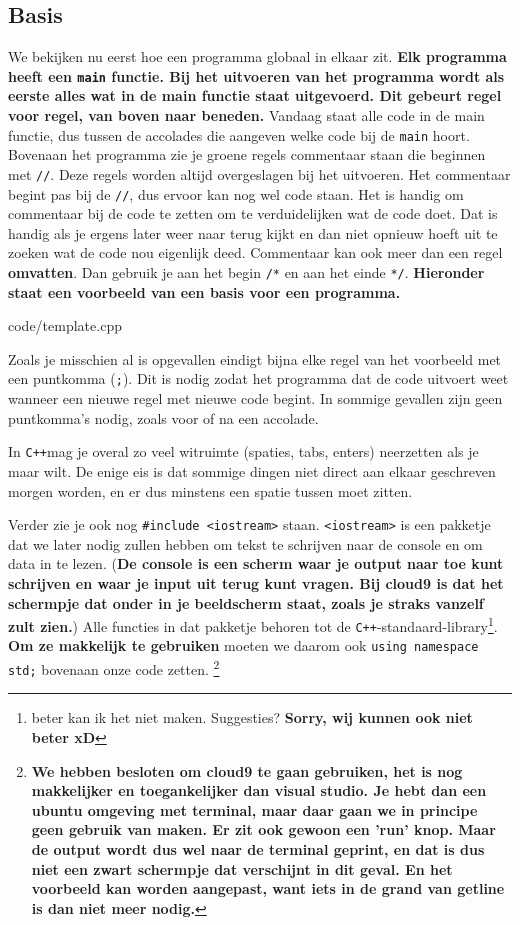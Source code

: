 \documentclass[12pt,a4paper]{article}
\newcommand{\code}{}
\newcommand{\icode}{\lstinline}
\newcommand{\mono}{\texttt}
\newcommand{\cpp}{\mono{C++}}
\begin{document}
\subsection{Basis}
We bekijken nu eerst hoe een programma globaal in elkaar zit.  \textbf{Elk programma heeft een \icode{main} functie. Bij het uitvoeren van het programma wordt als eerste alles wat in de main functie staat uitgevoerd. Dit gebeurt regel voor regel, van boven naar beneden.} Vandaag staat alle code in de main functie, dus tussen de accolades die aangeven welke code bij de \icode{main} hoort.
Bovenaan het programma zie je groene regels commentaar staan die beginnen met \icode{//}. Deze regels worden altijd overgeslagen bij het uitvoeren. Het commentaar begint pas bij de \icode{//}, dus ervoor kan nog wel code staan. Het is handig om commentaar bij de code te zetten om te verduidelijken wat de code doet. Dat is handig als je ergens later weer naar terug kijkt en dan niet opnieuw hoeft uit te zoeken wat de code nou eigenlijk deed. Commentaar kan ook meer dan een regel \textbf{omvatten}. Dan gebruik je aan het begin \icode{/*} en aan het einde \icode{*/}. \textbf{Hieronder staat een voorbeeld van een basis voor een programma.} 

\code{code/template.cpp}

Zoals je misschien al is opgevallen eindigt bijna elke regel van het voorbeeld met een puntkomma (\icode{;}). Dit is nodig zodat het programma dat de code uitvoert weet wanneer een nieuwe regel met nieuwe code begint. In sommige gevallen zijn geen puntkomma's nodig, zoals voor of na een accolade.

In \cpp  mag je overal zo veel witruimte (spaties, tabs, enters) neerzetten als je maar wilt. De enige eis is dat sommige dingen niet direct aan elkaar geschreven morgen worden, en er dus minstens een spatie tussen moet zitten.


Verder zie je ook nog \icode{#include <iostream>} staan. \icode{<iostream>} is een pakketje dat we later nodig zullen hebben om tekst te schrijven naar de console en om data in te lezen. (\textbf{De console is een scherm waar je output naar toe kunt schrijven en waar je input uit terug kunt vragen. Bij cloud9 is dat het schermpje dat onder in je beeldscherm staat, zoals je straks vanzelf zult zien.}) Alle functies in dat pakketje behoren tot de \cpp-standaard-library\footnote{beter kan ik het niet maken. Suggesties? \textbf{Sorry, wij kunnen ook niet beter xD}}. \textbf{Om ze makkelijk te gebruiken} moeten we daarom ook \icode{using namespace std;} bovenaan onze code zetten. \footnote{\textbf{We hebben besloten om cloud9 te gaan gebruiken, het is nog makkelijker en toegankelijker dan visual studio. Je hebt dan een ubuntu omgeving met terminal, maar daar gaan we in principe geen gebruik van maken. Er zit ook gewoon een 'run' knop. Maar de output wordt dus wel naar de terminal geprint, en dat is dus niet een zwart schermpje dat verschijnt in dit geval. En het voorbeeld kan worden aangepast, want iets in de grand van getline is dan niet meer nodig.}}
\end{document}
